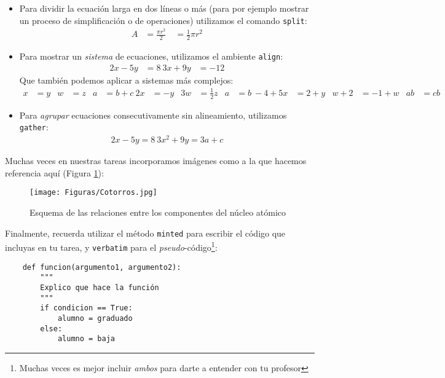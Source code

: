 \documentclass{assignment}
\begin{document}
\begin{problem}
\begin{itemize}
    \item Para dividir la ecuación larga en dos líneas o más (para por ejemplo mostrar un proceso de simplificación o de operaciones) utilizamos el comando \texttt{split}:
    \begin{equation} \label{eq1}
        \begin{split}
            A & = \frac{\pi r^2}{2} \
             & = \frac{1}{2} \pi r^2
        \end{split}
    \end{equation}

    \item Para mostrar un \textit{sistema} de ecuaciones, utilizamos el ambiente \texttt{align}: 
    \begin{align*} 
        2x - 5y &=  8 \
        3x + 9y &=  -12
    \end{align*}
    Que también podemos aplicar a sistemas más complejos:
    \begin{align*}
        x&=y           &  w &=z              &  a&=b+c\
        2x&=-y         &  3w&=\frac{1}{2}z   &  a&=b\
        -4 + 5x&=2+y   &  w+2&=-1+w          &  ab&=cb
    \end{align*}
    
    \item Para \textit{agrupar} ecuaciones consecutivamente sin alineamiento, utilizamos \texttt{gather}:
    \begin{gather*} 
        2x - 5y =  8 \
        3x^2 + 9y =  3a + c
    \end{gather*}
\end{itemize}
\noindent Muchas veces en nuestras tareas incorporamos imágenes como a la que hacemos referencia aquí (Figura \ref{fig:yo_en_la_vida}):
\begin{figure}[ht] %
    \centering
    \texttt{[image: Figuras/Cotorros.jpg]} %
    \caption{Esquema de las relaciones entre los componentes del núcleo atómico}
    \label{fig:yo_en_la_vida}
\end{figure}

\noindent Finalmente, recuerda utilizar el método \texttt{minted} para escribir el código que incluyas en tu tarea, y \texttt{verbatim} para el \textit{pseudo}-código\footnote{Muchas veces es mejor incluir \textit{ambos} para darte a entender con tu profesor}:

\begin{verbatim}
    def funcion(argumento1, argumento2):
        """
        Explico que hace la función
        """
        if condicion == True:
            alumno = graduado
        else:
            alumno = baja
\end{verbatim}

\end{problem}
\end{document}

